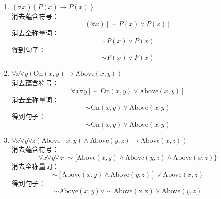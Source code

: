 \begin{solution}
	\begin{enumerate}
		 \item $\left(\forall x\right) \left\{P\left(x\right) \to P\left(x\right)\right\}$ \\
		 	消去蕴含符号：
		 	\[(\forall x) [ \sim P(x) \vee P(x)] \]
		 	消去全称量词：
		 	\[\sim P(x) \vee P(x) \]
		 	得到句子：
		 	\[\sim P(x) \vee P(x) \]
		 	
         \item $\forall x \forall y \left(\mathrm{On} \left(x,y\right) \to \mathrm{Above} \left(x,y\right) \right)$ \\
         	消去蕴含符号：
         	\[ \forall x \forall y [\sim \mathrm{On} (x,y) \vee \mathrm{Above} (x,y)] \]
         	消去全称量词：
         	\[ \sim \mathrm{On} (x,y) \vee \mathrm{Above} (x,y) \]
         	得到句子：
         	\[ \sim \mathrm{On} (x,y) \vee \mathrm{Above} (x,y) \]
         \item $\forall x \forall y \forall z \left(\mathrm{Above} \left(x,y\right) \wedge \mathrm{Above}\left(y,z\right) \to \mathrm{Above}\left(x,z\right) \right)$ \\
         	消去蕴含符号：
         	\[ \forall x \forall y \forall z \{ \sim [ \mathrm{Above} (x,y) \wedge \mathrm{Above} (y,z) \wedge \mathrm{Above} (x,z) \} \]
         	消去全称量词：
         	\[ \sim [ \mathrm{Above} (x,y) \wedge \mathrm{Above} (y,z) ] \vee \mathrm{Above} (x,z)\]
         	得到句子：
         	\[ \sim \mathrm{Above} (x,y) \vee \sim \mathrm{Above(x,z)} \vee \mathrm{Above} (y,z) \]
         	

\end{enumerate}
\end{solution}
